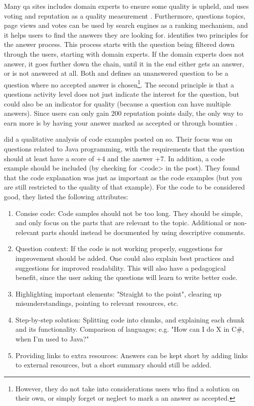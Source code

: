Many \gls{qa} sites includes domain experts to ensure some quality is upheld, and uses voting and reputation as a quality measurement \cite{Anderson2012}.
Furthermore, questions topics, page views and votes can be used by search engines as a ranking mechanism, and it helps users to find the answers they are looking for. 
\textcite{Anderson2012} identifies two principles for the answer process. 
This process starts with the question being filtered down through the users, starting with domain experts. 
If the domain experts does not answer, it goes further down the chain, until it in the end either gets an answer, or is not answered at all.
Both \textcite{Anderson2012} and \textcite{Treude2011} defines an unanswered question to be a question where no accepted answer is chosen\footnote{
	However, they do not take into considerations users who find a solution on their own, or simply forget or neglect to mark a an answer as accepted.
}. 
The second principle is that a questions activity level does not just indicate the interest for the question, but could also be an indicator for quality 
(because a question can have multiple answers). 
Since users can only gain 200 reputation points daily, the only way to earn more is by having your answer marked as accepted or through bounties \cite{StackOverflow.com2016d}.





\textcite{Nasehi2012} did a qualitative analysis of code examples posted on \gls{so}. 
Their focus was on questions related to Java programming, with the requirements that the question should at least have a score of +4 and the answer +7. 
In addition, a code example should be included (by checking for <code> in the post).
They found that the code explanation was just as important as the code examples (but you are still restricted to the quality of that example).
For the code to be considered good, they listed the following attributes: 
\begin{enumerate}
	\item Consise code: Code samples should not be too long. 
	They should be simple, and only focus on the parts that are relevant to the topic.
	Additional or non-relevant parts should instead be documented by using descriptive comments.
	\item Question context: 
	If the code is not working properly, suggestions for improvement should be added. 
	One could also explain best practices and suggestions for improved readability.
	This will also have a pedagogical benefit, since the user asking the questions will learn to write better code.
	\item Highlighting important elements: 
	"Straight to the point", clearing up misunderstandings, pointing to relevant resources, etc.
	\item Step-by-step solution: 
	Splitting code into chunks, and explaining each chunk and its functionality.
	Comparison of languages; e.g. "How can I do X in C\#, when I'm used to Java?"
	\item Providing links to extra resources: 
	Answers can be kept short by adding links to external resources, but a short summary should still be added.
\end{enumerate}


